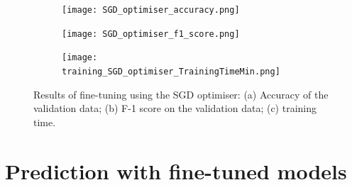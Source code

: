 \documentclass[a4paper,12pt]{article}
\newcommand{\figwidthh}{0.48\textwidth}
\begin{document}
\begin{figure}[p] 
	\begin{center}
		\begin{subfigure}[b]{\figwidthh}
			\caption{} 
			\texttt{[image: SGD\_optimiser\_accuracy.png]}
		\end{subfigure}
        \hfill
		\begin{subfigure}[b]{\figwidthh}
			\caption{}
			\texttt{[image: SGD\_optimiser\_f1\_score.png]}
		\end{subfigure}
        \hfill
		\begin{subfigure}[b]{\figwidthh}
			\caption{}
			\texttt{[image: training\_SGD\_optimiser\_TrainingTimeMin.png]}
		\end{subfigure}
	\end{center}
	\caption{Results of fine-tuning using the SGD optimiser: (a) Accuracy of the validation data; (b) F-1 score on the validation data; (c) training time. 
	} 
	\label{fig:res_training_SGD}
\end{figure}

\newpage



\section{Prediction with fine-tuned models}
\end{document}
